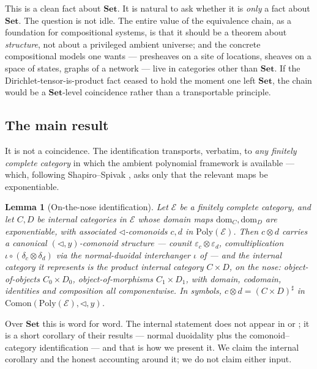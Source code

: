 \documentclass[11pt]{amsart}
\theoremstyle{plain}
\newtheorem{lemma}[theorem]{Lemma}
\theoremstyle{definition}
\theoremstyle{remark}
\newcommand{\Set}{\mathbf{Set}}
\newcommand{\Poly}{\mathrm{Poly}}
\newcommand{\Comon}{\mathrm{Comon}}
\newcommand{\Ee}{\mathcal{E}}
\newcommand{\sub}{\triangleleft}      %
\newcommand{\sharpc}[1]{#1^{\sharp}}   %
\newcommand{\dom}{\mathrm{dom}}
\begin{document}
This is a clean fact about $\Set$. It is natural to ask whether it is \emph{only} a fact about
$\Set$. The question is not idle. The entire value of the equivalence chain, as a foundation for
compositional systems, is that it should be a theorem about \emph{structure}, not about a privileged
ambient universe; and the concrete compositional models one wants --- presheaves on a site of
locations, sheaves on a space of states, graphs of a network --- live in categories other than
$\Set$. If the Dirichlet-tensor-is-product fact ceased to hold the moment one left $\Set$, the chain
would be a $\Set$-level coincidence rather than a transportable principle.

\subsection*{The main result}

It is not a coincidence. The identification transports, verbatim, to \emph{any finitely complete
category} in which the ambient polynomial framework is available --- which, following
Shapiro--Spivak \cite{ShapiroSpivak2023}, asks only that the relevant maps be exponentiable.

\begin{lemma}[On-the-nose identification]\label{lem:main}
Let $\Ee$ be a finitely complete category, and let $C,D$ be internal categories in $\Ee$ whose
domain maps $\dom_C,\dom_D$ are exponentiable, with associated $\sub$-comonoids $c,d$ in
$\Poly(\Ee)$. Then $c\otimes d$ carries a canonical $(\sub,y)$-comonoid structure --- counit
$\varepsilon_c\otimes\varepsilon_d$, comultiplication $\iota\circ(\delta_c\otimes\delta_d)$ via the
normal-duoidal interchanger $\iota$ of \cite[Thm.~4.5]{ShapiroSpivak2023} --- and the internal
category it represents is the product internal category $C\times D$, \emph{on the nose}:
object-of-objects $C_0\times D_0$, object-of-morphisms $C_1\times D_1$, with domain, codomain,
identities and composition all componentwise. In symbols, $c\otimes d=\sharpc{(C\times D)}$ in
$\Comon(\Poly(\Ee),\sub,y)$.
\end{lemma}

Over $\Set$ this is \cite[Prop.~8.79]{NiuSpivak2023} word for word. The internal statement does not
appear in \cite{ShapiroSpivak2023} or \cite{NiuSpivak2023}; it is a short corollary of their results
--- normal duoidality \cite[Thm.~4.5]{ShapiroSpivak2023} plus the comonoid--category identification
\cite[Thm.~5.6, Rem.~5.7]{ShapiroSpivak2023} --- and that is how we present it. We claim the
internal corollary and the honest accounting around it; we do not claim either input.
\end{document}
